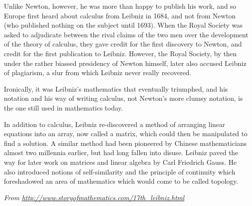 Unlike Newton, however, he was more than happy to publish his work, and so Europe first heard about calculus from Leibniz in 1684, and not from Newton (who published nothing on the subject until 1693). When the Royal Society was asked to adjudicate between the rival claims of the two men over the development of the theory of calculus, they gave credit for the first discovery to Newton, and credit for the first publication to Leibniz. However, the Royal Society, by then under the rather biassed presidency of Newton himself, later also accused Leibniz of plagiarism, a slur from which Leibniz never really recovered.

Ironically, it was Leibniz’s mathematics that eventually triumphed, and his notation and his way of writing calculus, not Newton’s more clumsy notation, is the one still used in mathematics today.

In addition to calculus, Leibniz re-discovered a method of arranging linear equations into an array, now called a matrix, which could then be manipulated to find a solution. A similar method had been pioneered by Chinese mathematicians almost two millennia earlier, but had long fallen into disuse. Leibniz paved the way for later work on matrices and linear algebra by Carl Friedrich Gauss. He also introduced notions of self-similarity and the principle of continuity which foreshadowed an area of mathematics which would come to be called topology.

\textit{From \url{http://www.storyofmathematics.com/17th_leibniz.html}}

\clearpage

